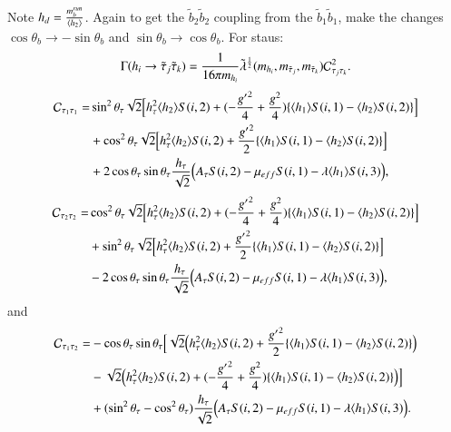 \documentclass[final,3p,times]{elsarticle}
\begin{document}
Note $h_{d} = {m_{b}^{run} \over \langle h_{2} \rangle}$. Again to get the $\tilde{b}_2 \tilde{b}_2$ coupling from the $\tilde{b}_1 \tilde{b}_1$, make the changes $\cos\theta_b \rightarrow -\sin\theta_b$ and $\sin\theta_b \rightarrow \cos\theta_b$.
For staus:
\begin{equation} \label{hstaustauNMSSM}
\Gamma( h_{i} \rightarrow \tilde{\tau}_{j} \tilde{\tau}_{k} ) = {1 \over 16\pi m_{h_i}} \tilde{\lambda}^{1 \over 2}(m_{{h}_i},m_{\tilde{\tau}_j},m_{\tilde{\tau}_k})\mathcal{C}_{\tau_{j}\tau_{k}}^2.
\end{equation}
\begin{equation}
\begin{aligned}
\mathcal{C}_{\tau_{1}\tau_{1}} = & \sin^2\theta_\tau \sqrt{2}\Big[h_{\tau}^2 \langle h_{2} \rangle S(i,2) + (-{{g'}^{2} \over 4} + {g^2 \over 4})\{\langle h_{1} \rangle S(i,1) - \langle h_{2} \rangle S(i,2)\}\Big] \\ & + \cos^2 \theta_\tau \sqrt{2} \Big[h_{\tau}^2 \langle h_{2} \rangle S(i,2) + {{g'}^2 \over 2}\{\langle h_{1} \rangle S(i,1) - \langle h_{2} \rangle S(i,2)\}\Big] \\ & + 2\cos\theta_\tau \sin\theta_\tau {h_{\tau} \over \sqrt{2}}\Big(A_{\tau} S(i,2) - \mu_{eff} S(i,1) - \lambda \langle h_{1} \rangle S(i,3)\Big),
\end{aligned}
\end{equation}
\begin{equation}
\begin{aligned}
\mathcal{C}_{\tau_{2}\tau_{2}} = & \cos^2\theta_\tau \sqrt{2}\Big[h_{\tau}^2 \langle h_{2} \rangle S(i,2) + (-{{g'}^{2} \over 4} + {g^2 \over 4})\{\langle h_{1} \rangle S(i,1) - \langle h_{2} \rangle S(i,2)\}\Big] \\ & + \sin^2 \theta_\tau \sqrt{2} \Big[h_{\tau}^2 \langle h_{2} \rangle S(i,2) + {{g'}^2 \over 2}\{\langle h_{1} \rangle S(i,1) - \langle h_{2} \rangle S(i,2)\}\Big] \\ & - 2\cos\theta_\tau \sin\theta_\tau {h_{\tau} \over \sqrt{2}}\Big(A_{\tau} S(i,2) - \mu_{eff} S(i,1) - \lambda \langle h_{1} \rangle S(i,3)\Big), 
\end{aligned}
\end{equation}
and 
\begin{equation}
\begin{aligned}
\mathcal{C}_{\tau_{1}\tau_{2}} = & -\cos\theta_\tau \sin\theta_\tau \Big[\sqrt{2} \Big(h_{\tau}^2 \langle h_{2} \rangle S(i,2) + {{g'}^2 \over 2}\{\langle h_{1} \rangle S(i,1) - \langle h_{2} \rangle S(i,2)\}\Big) \\ & - \sqrt{2}\Big(h_{\tau}^2 \langle h_{2} \rangle S(i,2)  + (-{{g'}^2 \over 4} + {g^2 \over 4})\{\langle h_{1} \rangle S(i,1) - \langle h_{2} \rangle S(i,2)\}\Big)\Big] \\ & + (\sin^2 \theta_\tau - \cos^2 \theta_\tau) {h_{\tau} \over \sqrt{2}} \Big(A_{\tau} S(i,2) - \mu_{eff} S(i,1) - \lambda \langle h_{1} \rangle S(i,3)\Big).
\end{aligned}
\end{equation}
\end{document}
